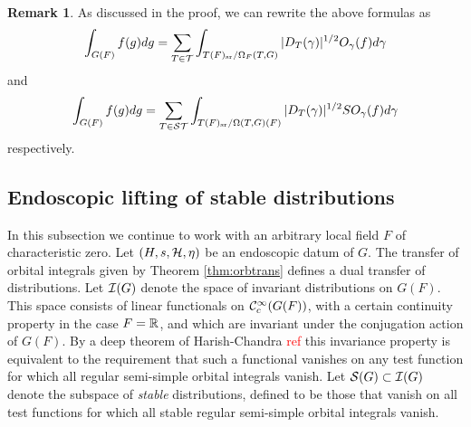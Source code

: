 \documentclass{article}
\theoremstyle{definition}
\newtheorem{rem}[thm]{Remark}
\numberwithin{equation}{section}
\renewcommand{\-}{\hyp{}}
\begin{document}
\begin{rem} \label{rem:weyl1}
	As discussed in the proof, we can rewrite the above formulas as
	\[ \int_{G(F)}f(g)dg = \sum_{T \in \mathcal{T}}\int_{T(F)_{\textrm{sr}}/\Omega_F(T,G)} |D_T(\gamma)|^{1/2} O_\gamma(f)d\gamma \]
	and
	\[ \int_{G(F)}f(g)dg = \sum_{T \in \mathcal{ST}}\int_{T(F)_{\textrm{sr}}/\Omega(T,G)(F)} |D_T(\gamma)|^{1/2} SO_\gamma(f)d\gamma \]
	respectively.
\end{rem}

\subsection{Endoscopic lifting of stable distributions} \label{sub:lifting}

In this subsection we continue to work with an arbitrary local field $F$ of characteristic zero. Let $(H,s,\mathcal{H},\eta)$ be an endoscopic datum of $G$. The transfer of orbital integrals given by Theorem \ref{thm:orbtrans} defines a dual transfer of distributions. Let $\mathcal{I}(G)$ denote the space of invariant distributions on $G(F)$. This space consists of linear functionals on $\mathcal{C}^\infty_c(G(F))$, with a certain continuity property in the case $F=\mathbb{R}$, and which are invariant under the conjugation action of $G(F)$. By a deep theorem of Harish-Chandra \textcolor{red}{ref}
 this invariance property is equivalent to the requirement that such a functional vanishes on any test function for which all regular semi-simple orbital integrals vanish. Let $\mathcal{S}(G) \subset \mathcal{I}(G)$ denote the subspace of \emph{stable} distributions, defined to be those that vanish on all test functions for which all stable regular semi-simple orbital integrals vanish.
\end{document}
